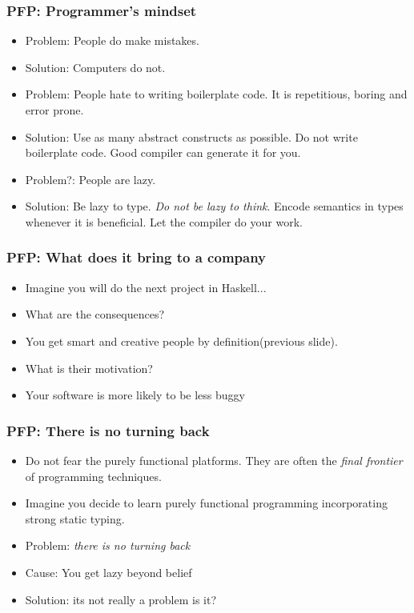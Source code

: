 \documentclass[11pt]{beamer}
\begin{document}
\begin{frame}
	\frametitle{PFP: Programmer's mindset}		
	\begin{itemize}[<+->]
		\item Problem: People do make mistakes. 
		\item Solution: Computers do not.
		\item Problem: People hate to writing boilerplate code. It is repetitious, boring and error prone.
		\item Solution: Use as many abstract constructs as possible. Do not write boilerplate code. Good compiler can generate it for you.
		\item Problem?: People are lazy.
		\item Solution: Be lazy to type. \textit{Do not be lazy to think}. Encode semantics in types whenever it is beneficial. Let the compiler do your work.
	\end{itemize}
\end{frame}

\begin{frame} 
	\frametitle{PFP: What does it bring to a company}		
	\begin{itemize}[<+->]
		\item Imagine you will do the next project in Haskell...
		\item What are the consequences?
		\item You get smart and creative people by definition(previous slide).
		\item What is their motivation?
		\item Your software is more likely to be less buggy
	\end{itemize}
\end{frame}

\begin{frame}
	\frametitle{PFP: There is no turning back}
	\begin{itemize}[<+->]
		\item Do not fear the purely functional platforms. They are often the \textit{final frontier} of programming techniques.
		\item Imagine you decide to learn purely functional programming incorporating strong static typing.
		\item Problem: \textit{there is no turning back}
		\item Cause: You get lazy beyond belief
		\item Solution: its not really a problem is it?
	\end{itemize}
\end{frame}
\end{document}
